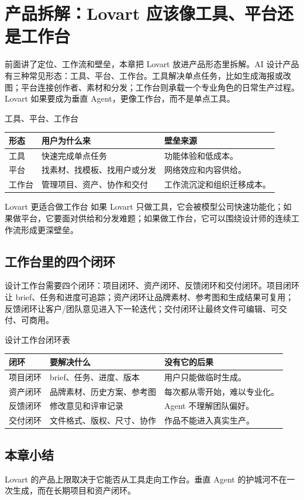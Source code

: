 \section{产品拆解：Lovart 应该像工具、平台还是工作台}

前面讲了定位、工作流和壁垒，本章把 Lovart 放进产品形态里拆解。AI 设计产品有三种常见形态：工具、平台、工作台。工具解决单点任务，比如生成海报或改图；平台连接创作者、素材和分发；工作台则承载一个专业角色的日常生产过程。Lovart 如果要成为垂直 Agent，更像工作台，而不是单点工具。

\begin{knowledgebox}{工具、平台、工作台}
\begin{tabularx}{\textwidth}{p{}p{}X}
\toprule
形态 & 用户为什么来 & 壁垒来源 \\
\midrule
工具 & 快速完成单点任务 & 功能体验和低成本。 \\
平台 & 找素材、找模板、找用户或分发 & 网络效应和内容供给。 \\
工作台 & 管理项目、资产、协作和交付 & 工作流沉淀和组织迁移成本。 \\
\bottomrule
\end{tabularx}
\end{knowledgebox}

\begin{importantbox}{Lovart 更适合做工作台}
如果 Lovart 只做工具，它会被模型公司快速功能化；如果做平台，它要面对供给和分发难题；如果做工作台，它可以围绕设计师的连续工作流形成更深壁垒。
\end{importantbox}

\subsection{工作台里的四个闭环}

设计工作台需要四个闭环：项目闭环、资产闭环、反馈闭环和交付闭环。项目闭环让 brief、任务和进度可追踪；资产闭环让品牌素材、参考图和生成结果可复用；反馈闭环让客户/团队意见进入下一轮迭代；交付闭环让最终文件可编辑、可交付、可商用。

\begin{knowledgebox}{设计工作台闭环表}
\begin{tabularx}{\textwidth}{p{}p{}X}
\toprule
闭环 & 要解决什么 & 没有它的后果 \\
\midrule
项目闭环 & brief、任务、进度、版本 & 用户只能做临时生成。 \\
资产闭环 & 品牌素材、历史方案、参考图 & 每次都从零开始，难以专业化。 \\
反馈闭环 & 修改意见和评审记录 & Agent 不理解团队偏好。 \\
交付闭环 & 文件格式、版权、尺寸、协作 & 作品不能进入真实生产。 \\
\bottomrule
\end{tabularx}
\end{knowledgebox}

\subsection{本章小结}

Lovart 的产品上限取决于它能否从工具走向工作台。垂直 Agent 的护城河不在一次生成，而在长期项目和资产闭环。

